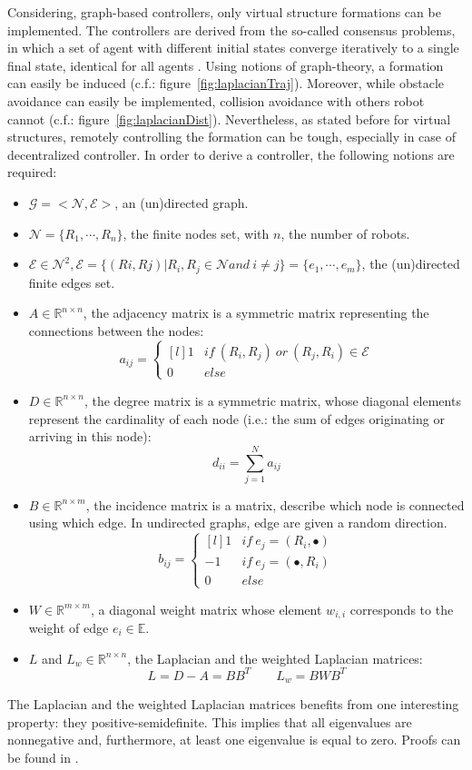 \documentclass[a4paper, 12pt]{report}
\begin{document}
Considering, graph-based controllers, only virtual structure formations can be implemented. The controllers are derived from the so-called consensus problems, in which a set of agent with different initial states converge iteratively to a single final state, identical for all agents \cite{Ren2005}. Using notions of graph-theory, a formation can easily be induced (c.f.: figure~\ref{fig:laplacianTraj}). Moreover, while obstacle avoidance can easily be implemented, collision avoidance with others robot cannot (c.f.: figure~\ref{fig:laplacianDist}). Nevertheless, as stated before for virtual structures, remotely controlling the formation can be tough, especially in case of decentralized controller.  In order to derive a controller, the following notions are required:
\begin{itemize}
\item $\mathcal{G} = <\mathcal{N}, \mathcal{E}>$, an (un)directed graph.
\item $\mathcal{N} = \{R_1, \cdots, R_n\}$, the finite nodes set,  with $n$, the number of robots.
\item $\mathcal{E} \in \mathcal{N}^2, \mathcal{E} = \{(Ri,Rj)| R_i, R_j \in \mathcal{N} and\ i \neq j\} = \{e_1, \cdots, e_m\} $, the (un)directed finite edges set.
\item $A \in  \mathbb{R}^{n \times n} $, the adjacency matrix is a symmetric matrix representing the connections between the nodes:
\[a_{ij} =  \left\{ \begin{matrix*}[l] 1 & if\ (R_i, R_j)\ or\ (R_j, R_i) \in \mathcal{E} \\ 0 & else \end{matrix*} \right.\]
\item $D \in  \mathbb{R}^{n \times n} $, the degree matrix is a symmetric matrix, whose diagonal elements represent the cardinality of each node (i.e.: the sum of edges originating or arriving in this node):
\[d_{ii} =  \sum_{j=1}^{N} a_{ij}\]
\item $B \in  \mathbb{R}^{n \times m} $, the incidence matrix is a matrix, describe which node is connected using which edge. In undirected graphs, edge are given a random direction.
\[b_{ij} =  \left\{ \begin{matrix*}[l] 1 & if\ e_j = (R_i, \bullet) \\-1 & if\ e_j = (\bullet, R_i)  \\ 0 & else \end{matrix*} \right.\]
\item $W \in \mathbb{R}^{m\times m} $, a diagonal weight matrix whose element $w_{i,i}$ corresponds to the weight of edge $e_i \in \mathbb{E}$.
\item $L$ and $L_w\in \mathbb{R}^{n\times n} $, the Laplacian and the weighted Laplacian matrices:
\[ L = D-A = BB^T \qquad L_w = BWB^T\]
\end{itemize}  
The Laplacian and the weighted Laplacian matrices benefits from one interesting property: they positive-semidefinite. This implies that all eigenvalues are nonnegative and, furthermore, at least one eigenvalue is equal to zero. Proofs can be found in \cite{Gowal2013}. 
\end{document}
